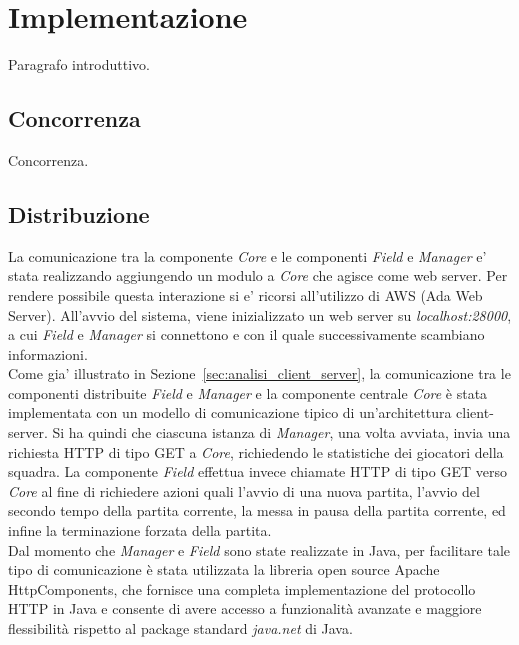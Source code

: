 
\section{Implementazione}
\label{sec:implementazione}

Paragrafo introduttivo.

\subsection{Concorrenza}
\label{sec:implemetazione_concorrenza}

Concorrenza.

\subsection{Distribuzione}
\label{sec:implementazione_distribuzione}

La comunicazione tra la componente \emph{Core} e le componenti \emph{Field} e \emph{Manager} e' stata realizzando aggiungendo un modulo a \emph{Core} che agisce come web server. Per rendere possibile questa interazione si e' ricorsi all'utilizzo di AWS (Ada Web Server). All'avvio del sistema, viene inizializzato un web server su \emph{localhost:28000}, a cui \emph{Field} e \emph{Manager} si connettono e con il quale successivamente scambiano informazioni.\\

Come gia' illustrato in Sezione~\ref{sec:analisi_client_server}, la comunicazione tra le componenti distribuite \emph{Field} e \emph{Manager} e la componente centrale \emph{Core} \`{e} stata implementata con un modello di comunicazione tipico di un’architettura client-server. Si ha quindi che ciascuna istanza di \emph{Manager}, una volta avviata, invia una richiesta HTTP di tipo GET a \emph{Core}, richiedendo le statistiche dei giocatori della squadra. La componente \emph{Field} effettua invece chiamate HTTP di tipo GET verso \emph{Core} al fine di richiedere azioni quali l'avvio di una nuova partita, l'avvio del secondo tempo della partita corrente, la messa in pausa della partita corrente, ed infine la terminazione forzata della partita.\\

Dal momento che \textit{Manager} e \textit{Field} sono state realizzate in Java, per facilitare tale tipo di comunicazione \`{e} stata utilizzata la libreria open source Apache HttpComponents, che fornisce una completa implementazione del protocollo HTTP in Java e consente di avere accesso a funzionalit\`{a} avanzate e maggiore flessibilit\`{a} rispetto al package standard \emph{java.net} di Java.\\

